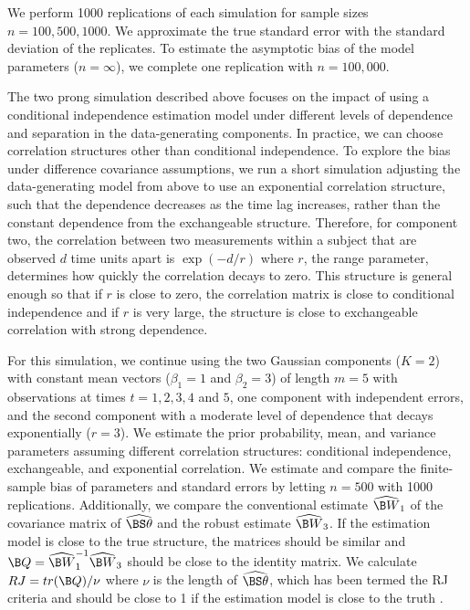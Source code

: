 We perform 1000 replications of each simulation for sample sizes $n=100, 500, 1000$. We approximate the true standard error with the standard deviation of the replicates. To estimate the asymptotic bias of the model parameters ($n=\infty$), we complete one replication with $n=100,000$.

The two prong simulation described above focuses on the impact of using a conditional independence estimation model under different levels of dependence and separation in the data-generating components. In practice, we can choose correlation structures other than conditional independence. To explore the bias under difference covariance assumptions, we run a short simulation adjusting the data-generating model from above to use an exponential correlation structure, such that the dependence decreases as the time lag increases, rather than the constant dependence from the exchangeable structure. Therefore, for component two, the correlation between two measurements within a subject that are observed $d$ time units apart is $\exp(-d/r)$ where $r$, the range parameter, determines how quickly the correlation decays to zero. This structure is general enough so that if $r$ is close to zero, the correlation matrix is close to conditional independence and if $r$ is very large, the structure is close to exchangeable correlation with strong dependence. 

For this simulation, we continue using the two Gaussian components ($K = 2$) with constant mean vectors ($\beta_{1}=1$ and $\beta_{2}=3$) of length $m=5$ with observations at times $t=1,2,3,4$ and $5$, one component with independent errors, and the second component with a moderate level of dependence that decays exponentially ($r=3$). We estimate the prior probability, mean, and variance parameters assuming different correlation structures: conditional independence, exchangeable, and exponential correlation. We estimate and compare the finite-sample bias of parameters and standard errors by letting $n=500$ with 1000 replications. Additionally, we compare the conventional estimate $\widehat{\B W}_{1}$ of the covariance matrix of $\widehat{\BS \theta}$ and the robust estimate $\widehat{\B W}_{3}$. If the estimation model is close to the true structure, the matrices should be similar and $\B Q = \widehat{\B W}_{1}^{-1}\widehat{\B W}_{3}$ should be close to the identity matrix. We calculate $RJ=tr(\B Q)/\nu$ where $\nu$ is the length of $\widehat{\BS\theta}$, which has been termed the RJ criteria and should be close to 1 if the estimation model is close to the truth \cite{shults2009,rotnitzky1990}.


